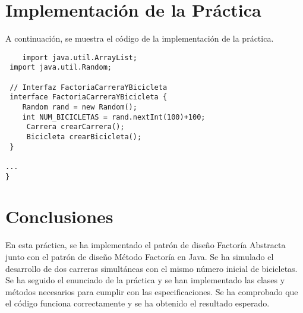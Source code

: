 \documentclass{article}
\begin{document}
\section{Implementación de la Práctica}
A continuación, se muestra el código de la implementación de la práctica.

\begin{verbatim}
    import java.util.ArrayList;
 import java.util.Random;
 
 // Interfaz FactoriaCarreraYBicicleta
 interface FactoriaCarreraYBicicleta {
    Random rand = new Random();
    int NUM_BICICLETAS = rand.nextInt(100)+100;
     Carrera crearCarrera();
     Bicicleta crearBicicleta();
 }
 
...
}
\end{verbatim}

\section{Conclusiones}
En esta práctica, se ha implementado el patrón de diseño Factoría Abstracta junto con el patrón de diseño Método Factoría en Java. Se ha simulado el desarrollo de dos carreras simultáneas con el mismo número inicial de bicicletas. Se ha seguido el enunciado de la práctica y se han implementado las clases y métodos necesarios para cumplir con las especificaciones. Se ha comprobado que el código funciona correctamente y se ha obtenido el resultado esperado.
\end{document}
